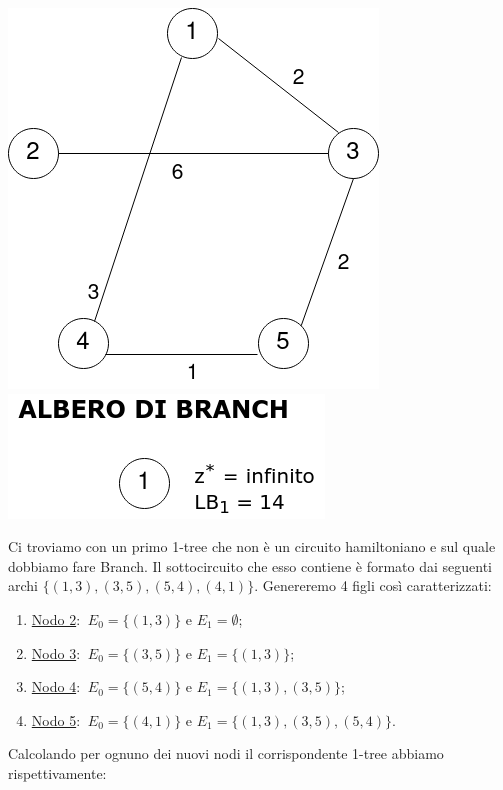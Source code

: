 \documentclass[
	article,			%
	12pt,				%
	oneside,			%
	a4paper,			%
	english,			%
	italian,				%
	sumario=tradicional,
	]{abntex2}
\begin{document}
\begin{center}
    \includegraphics[scale=0.33]{files/primo1Tree.png}
    \qquad \qquad \qquad
    \includegraphics[scale=0.4]{files/alberoBranch1.png}
\end{center}
Ci troviamo con un primo 1-tree che non è un circuito hamiltoniano e sul quale dobbiamo fare Branch. Il sottocircuito che esso contiene è formato dai seguenti archi $\{(1,3),(3,5),(5,4),(4,1)\}$. Genereremo 4 figli così caratterizzati:
\begin{enumerate}
    \item [] \underline{Nodo 2}: $\:E_0 = \{(1,3)\}$ e $E_1 = \emptyset$;
    \item [] \underline{Nodo 3}: $\:E_0 = \{(3,5)\}$ e $E_1 = \{(1,3)\}$;
    \item [] \underline{Nodo 4}: $\:E_0 = \{(5,4)\}$ e $E_1 = \{(1,3),(3,5)\}$;
    \item [] \underline{Nodo 5}: $\:E_0 = \{(4,1)\}$ e $E_1 = \{(1,3),(3,5),(5,4)\}$.
\end{enumerate}
Calcolando per ognuno dei nuovi nodi il corrispondente 1-tree abbiamo rispettivamente:
\end{document}
